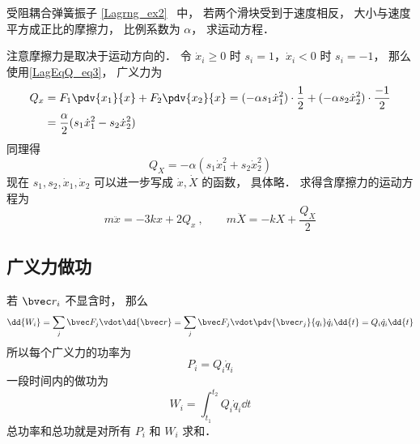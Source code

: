 \begin{example}{受阻耦合弹簧振子}
\autoref{Lagrng_ex2}~ 中， 若两个滑块受到于速度相反， 大小与速度平方成正比的摩擦力， 比例系数为 $\alpha$， 求运动方程．

注意摩擦力是取决于运动方向的． 令 $\dot x_i \geqslant 0$ 时 $s_i = 1$，$\dot x_i < 0$ 时 $s_i = -1$， 那么使用\autoref{LagEqQ_eq3}， 广义力为
\begin{equation}
\begin{aligned}
Q_x &= F_1 \pdv{x_1}{x} + F_2 \pdv{x_2}{x} = (-\alpha s_1\dot x_1^2) \cdot \frac{1}{2} + (-\alpha s_2\dot x_2^2) \cdot \frac{-1}{2}\\
&= \frac{\alpha}{2}(s_1\dot x_1^2 - s_2 \dot x_2^2)
\end{aligned}
\end{equation}
同理得
\begin{equation}
Q_X = -\alpha(s_1 \dot x_1^2 + s_2\dot x_2^2)
\end{equation}
现在 $s_1,s_2,\dot x_1,\dot x_2$ 可以进一步写成 $\dot x, \dot X$ 的函数， 具体略． 求得含摩擦力的运动方程为
\begin{equation}
m\ddot x =  - 3kx + 2Q_x~, \qquad
m\ddot X =  - kX + \frac{Q_X}{2}
\end{equation}
\end{example}

\subsection{广义力做功}
若 $\bvec r_i$ 不显含时， 那么
\begin{equation}
\dd{W_i} = \sum_j \bvec F_j \vdot \dd{\bvec r} = \sum_j \bvec F_j \vdot \pdv{\bvec r_j}{q_i}\dot q_i \dd{t} = Q_i \dot q_i \dd{t}
\end{equation}
所以每个广义力的功率为
\begin{equation}
P_i = Q_i \dot q_i
\end{equation}
一段时间内的做功为
\begin{equation}
W_i = \int_{t_1}^{t_2} Q_i \dot q_i \dd{t}
\end{equation}
总功率和总功就是对所有 $P_i$ 和 $W_i$ 求和．
